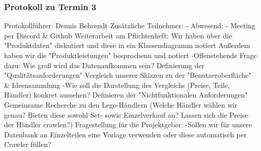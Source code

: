 \subsubsection{Protokoll zu Termin 3}
Protokollführer: Dennis Behrendt \newline
Zusätzliche Teilnehmer: - \newline
Abwesend: - \newline
Meeting per Discord & Github \newline
Weiterarbeit am Pflichtenheft: \newline
Wir haben über die "Produktdaten" diskutiert und diese in ein Klassendiagramm notiert \newline
Außerdem haben wir die "Produktleistungen" besprochenn und notiert \newline
 -Offenstehende Frage dazu: Wie groß wird das Datenaufkommen sein? \newline
Definierung der "Qualitätsanforderungen" \newline
Vergleich unserer Skizzen zu der "Benutzeroberfläche" & Ideensammlung \newline
 -Wie soll die Darstellung des Vergleichs (Preise, Teile, Händler) konkret aussehen? \newline
Definieren der "Nichtfunktionalen Anforderungen" \newline
Gemeinsame Recherche zu den Lego-Händlern (Welche Händler wählen wir genau? Bieten diese sowohl Set- sowie Einzelverkauf an? Lassen sich die Preise der Händler crawlen?) \newline
Fragestellung für die Projektgeber: \newline
 -Sollen wir für unsere Datenbank an Einzelteilen eine Vorlage verwenden oder diese automatisch per Crawler füllen? \newline
